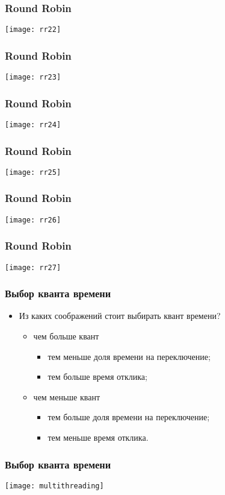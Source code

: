 \begin{frame}
\frametitle{Round Robin}
\texttt{[image: rr22]}
\end{frame}

\begin{frame}
\frametitle{Round Robin}
\texttt{[image: rr23]}
\end{frame}

\begin{frame}
\frametitle{Round Robin}
\texttt{[image: rr24]}
\end{frame}

\begin{frame}
\frametitle{Round Robin}
\texttt{[image: rr25]}
\end{frame}

\begin{frame}
\frametitle{Round Robin}
\texttt{[image: rr26]}
\end{frame}

\begin{frame}
\frametitle{Round Robin}
\texttt{[image: rr27]}
\end{frame}

\begin{frame}
\frametitle{Выбор кванта времени}
\begin{itemize}
    \item<1->Из каких соображений стоит выбирать квант времени?
    \begin{itemize}
        \item<2->чем больше квант
        \begin{itemize}
            \item<3->тем меньше доля времени на переключение;
            \item<3->тем больше время отклика;
        \end{itemize}
        \item<4->чем меньше квант
        \begin{itemize}
            \item<5->тем больше доля времени на переключение;
            \item<5->тем меньше время отклика.
        \end{itemize}
    \end{itemize}
\end{itemize}
\end{frame}

\begin{frame}
\frametitle{Выбор кванта времени}
\texttt{[image: multithreading]}
\end{frame}
